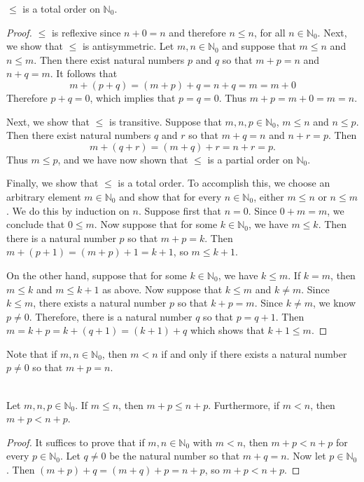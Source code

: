 \begin{proposition}
$\le$ is a total order on $\mathbb{N}_0$.
\end{proposition}
\begin{proof}
$\le$ is reflexive since $n+0=n$ and therefore $n\le n$, for all $n\in 
\mathbb{N}_0$.  Next, we show that $\le$ is antisymmetric.  
Let $m,n\in\mathbb{N}_0$ and suppose that $m\le n$ and $n\le m$.  
Then there exist natural numbers $p$ and $q$ so that $m+p=n$ and $n+q=m$.
It follows that
\[
m+(p+q)= (m+p)+q=n+q =m=m+0\]
Therefore $p+q=0$, which implies that $p=q=0$.  Thus $m+p=m+0=m=n$.

Next, we show that $\le$ is transitive.  Suppose that $m,n,p\in
\mathbb{N}_0$, $m\le n$ and $n\le p$.  Then there exist
natural numbers $q$ and $r$ so that $m+q=n$ and $n+r=p$.
Then
\[
m+(q+r)=(m+q)+r=n+r=p.
\]
Thus $m\le p$, and we have now shown that $\le$ is a partial
order on $\mathbb{N}_0$.


Finally, we show that $\le$ is a total order.
To accomplish this, we choose an arbitrary element $m\in\mathbb{N}_0$
and show that for every $n\in\mathbb{N}_0$, either $m\le n$ or
$n\le m$. We do this by induction on $n$.  
Suppose first that $n=0$.  Since $0+m=m$, we conclude that
$0\le m$.
Now suppose that for some $k\in\mathbb{N}_0$, we have
$m\le k$.  Then there is a natural number $p$ so that $m+p=k$.  Then
$m+(p+1) =(m+p)+1=k+1$, so $m\le k+1$.

On the other hand, suppose that for some $k\in\mathbb{N}_0$,
we have $k\le m$.  If $k=m$, then $m\le k$ and
$m\le k+1$ as above.  Now suppose that $k\le m$ and $k\neq m$.
Since $k\le m$, there exists a natural number $p$ so that $k+p=m$.
Since $k\neq m$, we know $p\neq 0$. Therefore, there is a 
natural number $q$ so that
$p=q+1$.  Then $m=k+p=k+(q+1)=(k+1)+q$ which shows that $k+1\le m$.
\end{proof}

Note that if $m,n\in\mathbb{N}_0$, then $m<n$ if and only if
there exists a natural number $p\neq 0$ so that $m+p=n$.

\begin{theorem}{}\\ 
Let $m,n,p\in \mathbb{N}_0$.  If $m\le n$, then
$m+p\le n+p$. Furthermore, if $m<n$, then $m+p<n+p$.
\end{theorem}

\begin{proof}
It suffices to prove that if $m,n\in \mathbb{N}_0$ with $m<n$, then
$m+p<n+p$ for every $p\in\mathbb{N}_0$.  Let $q\neq0$ be
the natural number so that $m+q =n$.  
Now let $p\in \mathbb{N}_0$.
Then $(m+p)+q=(m+q)+p=n+p$, so $m+p < n+p$.
\end{proof} 

